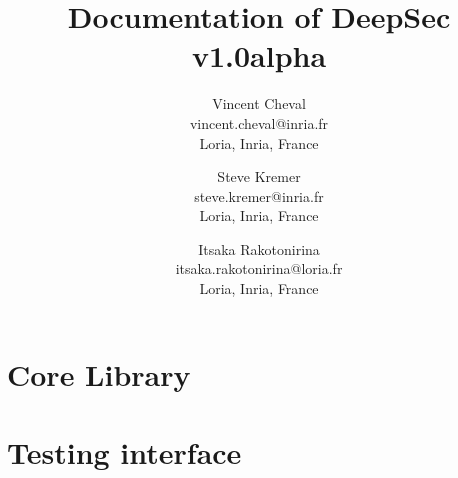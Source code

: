 \documentclass[a4paper,10pt]{book}
\title{Documentation of DeepSec v1.0alpha}
\author{
Vincent Cheval\\
vincent.cheval@inria.fr\\
Loria, Inria, France
\and
Steve Kremer\\
steve.kremer@inria.fr\\
Loria, Inria, France
\and
Itsaka Rakotonirina\\
itsaka.rakotonirina@loria.fr\\
Loria, Inria, France
}
\begin{document}
\maketitle

\tableofcontents

\chapter{Core Library}


\chapter{Testing interface}




\end{document}
